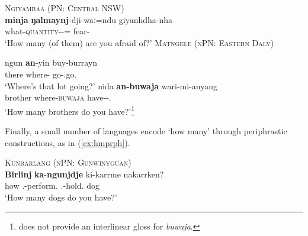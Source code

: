 \documentclass[12pt,egregdoesnotlikesansseriftitles]{scrartcl}
\begin{document}
 \begin{exe}
   \ex\label{ex:hmwhatq}\textsc{Ngiyambaa (PN: Central NSW)}\hfill {}\\
   \gll \textbf{minja}-\textbf{ŋalmaynj}-dji-waː=ndu giyanhdha-nha\\
   what-\textsc{quantity}-\Circ-\Excl=\Second\Nom{} fear-\Prs\\
   \glt `How many (of them) are you afraid of?'
   \ex \label{howmanyex2} \textsc{Matngele (nPN: Eastern Daly)}\hfill {}
   \begin{xlist}
     \ex \gll ngun \textbf{an}-yin buy-burrayn\\
     there where-\All{} go-\Third\Aug\Sbj.go.\Impv\\
     \glt `Where's that lot going?' %
     \ex \gll nida \textbf{an-buwaja} wari-mi-anyang\\
     brother where-\textsc{buwaja} have-\Impv-\Second\Min\Sbj.\Prs\\
     \glt `How many brothers do you have?'\footnote{\cite{zandvoort99} does not provide an interlinear gloss for \textit{buwaja}.} %
   \end{xlist}
 \end{exe}
  
 Finally, a small number of languages encode `how many'  through periphrastic constructions, as in (\ref{ex:hmprph}).
  
  \begin{exe}
  \ex\label{ex:hmprph}\textsc{Kunbarlang (nPN: Gunwinyguan)}\hfill \citep{I. Kapitonov, field notes}\\
  \gll \textbf{Birlinj} \textbf{ka}-\textbf{ngunjdje} ki-karrme nakarrken?\\
  how \Tsg.\Nfut-perform.\Np{} \Ssg.\Nfut-hold.\Np{} dog\\
  \glt `How many dogs do you have?' %
\end{exe}
\end{document}

